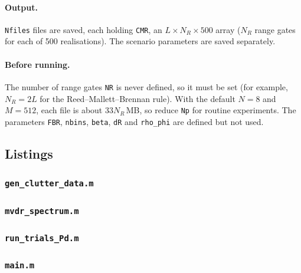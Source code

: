 \documentclass{article}
\begin{document}
\paragraph{Output.} \texttt{Nfiles} files are saved, each holding \texttt{CMR}, an $L\times N_R\times500$ array ($N_R$ range gates for each of 500 realisations). The scenario parameters are saved separately.

\paragraph{Before running.} The number of range gates \texttt{NR} is never defined, so it must be set (for example, $N_R=2L$ for the Reed--Mallett--Brennan rule). With the default $N=8$ and $M=512$, each file is about $33N_R$\,MB, so reduce \texttt{Np} for routine experiments. The parameters \texttt{FBR}, \texttt{nbins}, \texttt{beta}, \texttt{dR} and \texttt{rho\_phi} are defined but not used.

\subsection{Listings}\label{sec:code:listings}

\subsubsection*{\texttt{gen\_clutter\_data.m}}


\subsubsection*{\texttt{mvdr\_spectrum.m}}


\subsubsection*{\texttt{run\_trials\_Pd.m}}


\subsubsection*{\texttt{main.m}}


% 
\end{document}
